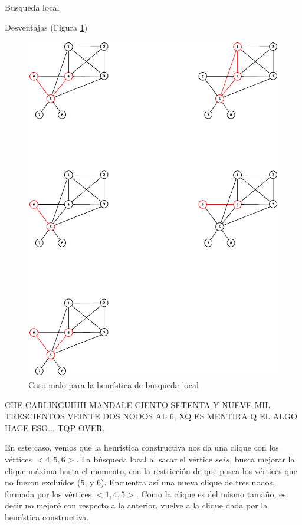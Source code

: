 \begin{section}{Busqueda local}
\begin{subsection}{Desventajas}
		(Figura \ref{fig:seguimiento_caso_malo_busqueda_local2})

			\begin{figure}[H]
				\centering
		    	\includegraphics[scale=0.5]{busqueda_local/segCasoMalo2.eps}
			    \caption{Caso malo para la heurística de búsqueda local}
			    \label{fig:seguimiento_caso_malo_busqueda_local2}
			\end{figure}

		CHE CARLINGUIIIII MANDALE CIENTO SETENTA Y NUEVE MIL TRESCIENTOS VEINTE DOS NODOS AL 6, XQ ES MENTIRA Q EL ALGO HACE ESO... TQP OVER.

		En este caso, vemos que la heurística constructiva nos da una clique con los vértices $<4,5,6>$. La búsqueda local al sacar el vértice $seis$, busca mejorar la clique máxima hasta el momento, con la restricción de que posea los vértices que no fueron excluídos ($5$, y $6$). Encuentra así una nueva clique de tres nodos, formada por los vértices $<1,4,5>$. Como la clique es del mismo tamaño, es decir no mejoró con respecto a la anterior, vuelve a la clique dada por la heurística constructiva.


\end{subsection}
\end{section}
